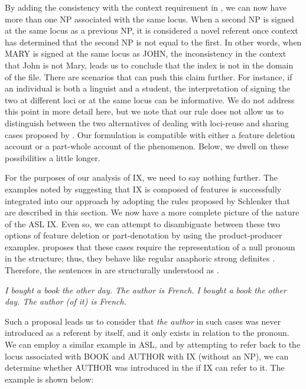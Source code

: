 \documentclass[output=paper,
modfonts
]{langscibook}
\begin{document}
By adding the consistency with the context requirement in , we can now have more than one NP associated with the same locus. When a second NP is signed at the same locus as a previous NP, it is considered a novel referent once context has determined that the second NP is not equal to the first. In other words, when MARY is signed at the same locus as JOHN, the inconsistency in the context that John is not Mary, leads us to conclude that the index is not in the domain of the file. There are scenarios that can push this claim further. For instance, if an individual is both a linguist and a student, the interpretation of signing the two at different loci or at the same locus can be informative. We do not address this point in more detail here, but we note that our rule does not allow us to distinguish between the two alternatives of dealing with loci-reuse and sharing cases proposed by \citeauthor{Schlenker2014}. Our formulation is compatible with either a feature deletion account or a part-whole account of the phenomenon. Below, we dwell on these possibilities a little longer. 

For the purposes of our analysis of IX, we need to say nothing further. The examples noted by \citeauthor{Kuhn2015} suggesting that IX is composed of features is successfully integrated into our approach by adopting the rules proposed by Schlenker that are described in this section. We now have a more complete picture of the nature of the ASL IX. Even so, we can attempt to disambiguate between these two options of feature deletion or part-denotation by using the product-producer  examples. \citet{Schwarz2009} proposes that these cases require the representation of a null pronoun in the structure; thus, they behave like regular anaphoric strong definites \citep[268]{Schwarz2009}. Therefore, the sentences in  are structurally understood as . 

\begin{exe}
	\ex 
	\begin{xlist} 
		\ex \label{ex:irani:81a} \textit{I bought a book the other day. The author is French.}
		\ex \label{ex:irani81b} \textit{I bought a book the other day. The author (of it) is French.}
	\end{xlist} 
\end{exe}

Such a proposal leads us to consider that \textit{the author} in such cases was never introduced as a referent by itself, and it only exists in relation to the pronoun. We can employ a similar example in ASL, and by attempting to refer back to the locus associated with BOOK and AUTHOR with IX (without an NP), we can determine whether AUTHOR was introduced in the  if IX can refer to it. The example is shown below:
\end{document}
